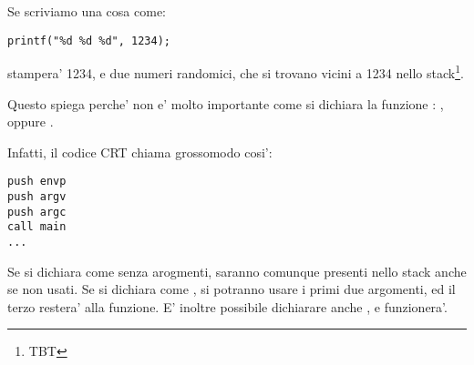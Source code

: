 Se scriviamo una cosa come:

\begin{lstlisting}
printf("%d %d %d", 1234);
\end{lstlisting}

\printf stampera' 1234, e due numeri randomici, che si trovano vicini a 1234 nello stack\footnote{\ac{TBT}}.

\par
Questo spiega perche' non e' molto importante come si dichiara la funzione \main : \main,  oppure .

Infatti, il codice \ac{CRT} chiama \main grossomodo cosi':

\begin{lstlisting}[style=customasmx86]
push envp
push argv
push argc
call main
...
\end{lstlisting}

Se si dichiara \main come \main senza arogmenti, saranno comunque presenti nello stack anche se non usati.
Se si dichiara \main come ,
si potranno usare i primi due argomenti, ed il terzo restera'  alla funzione.
E' inoltre possibile dichiarare anche , e funzionera'.
